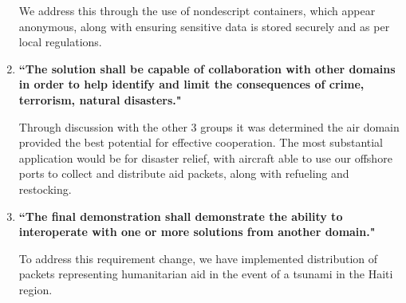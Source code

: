 \begin{enumerate}[label={\textbf{(\arabic*)}}, itemsep=3pt, topsep=4pt]
	We address this through the use of nondescript containers, which appear anonymous, along with ensuring sensitive data is stored securely and as per local regulations.

\item \textbf{``The solution shall be capable of collaboration with other domains in order to help identify and limit the consequences of crime, terrorism, natural disasters."}

	Through discussion with the other 3 groups it was determined the air domain provided the best potential for effective cooperation. The most substantial application would be for disaster relief, with aircraft able to use our offshore ports to collect and distribute aid packets, along with refueling and restocking.

\item \textbf{``The final demonstration shall demonstrate the ability to interoperate with one or more solutions from another domain."}

	To address this requirement change, we have implemented distribution of packets representing humanitarian aid in the event of a tsunami in the Haiti region.

\end{enumerate}
